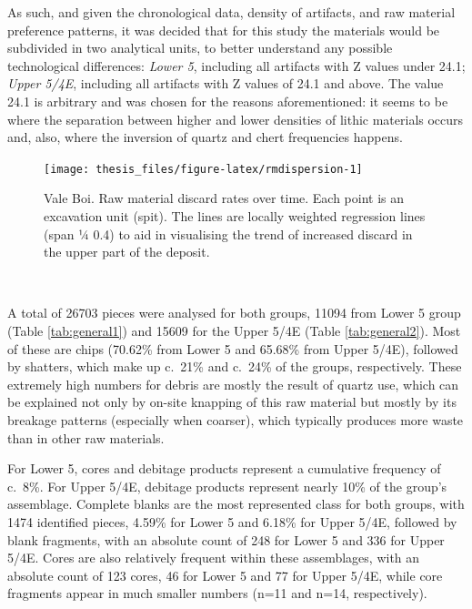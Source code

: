 \documentclass[12pt,twoside]{reedthesis}
\begin{document}
As such, and given the chronological data, density of artifacts, and raw material preference patterns, it was decided that for this study the materials would be subdivided in two analytical units, to better understand any possible technological differences: \emph{Lower 5}, including all artifacts with Z values under 24.1; \emph{Upper 5/4E}, including all artifacts with Z values of 24.1 and above. The value 24.1 is arbitrary and was chosen for the reasons aforementioned: it seems to be where the separation between higher and lower densities of lithic materials occurs and, also, where the inversion of quartz and chert frequencies happens.
\begin{figure}[H]

{\centering \texttt{[image: thesis\_files/figure-latex/rmdispersion-1]} 

}

\caption{Vale Boi. Raw material discard rates over time. Each point is an excavation unit (spit). The lines are locally weighted regression lines (span ¼ 0.4) to aid in visualising the trend of increased discard in the upper part of the deposit.}\label{fig:rmdispersion}
\end{figure}
~

A total of 26703 pieces were analysed for both groups, 11094 from Lower 5 group (Table \ref{tab:general1}) and 15609 for the Upper 5/4E (Table \ref{tab:general2}). Most of these are chips (70.62\% from Lower 5 and 65.68\% from Upper 5/4E), followed by shatters, which make up c.~21\% and c.~24\% of the groups, respectively. These extremely high numbers for debris are mostly the result of quartz use, which can be explained not only by on-site knapping of this raw material but mostly by its breakage patterns (especially when coarser), which typically produces more waste than in other raw materials.

For Lower 5, cores and debitage products represent a cumulative frequency of c.~8\%. For Upper 5/4E, debitage products represent nearly 10\% of the group's assemblage. Complete blanks are the most represented class for both groups, with 1474 identified pieces, 4.59\% for Lower 5 and 6.18\% for Upper 5/4E, followed by blank fragments, with an absolute count of 248 for Lower 5 and 336 for Upper 5/4E. Cores are also relatively frequent within these assemblages, with an absolute count of 123 cores, 46 for Lower 5 and 77 for Upper 5/4E, while core fragments appear in much smaller numbers (n=11 and n=14, respectively).
\end{document}
